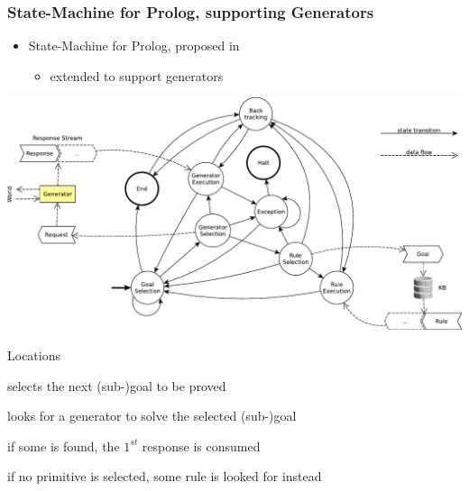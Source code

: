 \documentclass[presentation]{beamer}
\begin{document}
\begin{frame}[allowframebreaks]
    \frametitle{State-Machine for Prolog, supporting Generators}

    \begin{itemize}
        \item State-Machine for Prolog, proposed in 
        \begin{itemize}
            \item extended to support \alert{generators}
        \end{itemize}
    \end{itemize}

    \begin{center}
        \includegraphics[width=.8\linewidth]{img/2p-fsa-dataflow.pdf}
    \end{center}

    \begin{block}{Locations}
        \begin{description}\small
            \item[\textsf{Goal Selection}] selects the next (sub-)goal to be proved

            \item[\textbf{\textsf{Generator Selection}}] looks for a generator to solve the selected (sub-)goal
            
            \item[\textbf{\textsf{Generator Execution}}] if some is found, the $1^{st}$ response is consumed
        
            \item[\textsf{Rule Selection}] if no primitive is selected, some rule is looked for instead
            

\end{description}
\end{block}
\end{frame}
\end{document}

